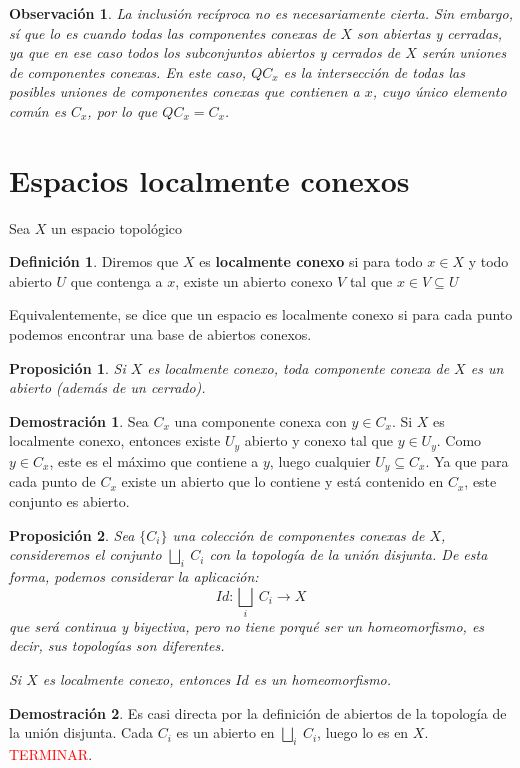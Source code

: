 \documentclass[12pt,twoside]{report}
\theoremstyle{azul}
\theoremstyle{azul2}
\newtheorem*{obsx}{Observación}
\theoremstyle{plain}
\newtheorem*{prop}{Proposición}
\theoremstyle{definition}
\newtheorem*{defi}{Definición}
\newtheorem*{dem}{Demostración}
\theoremstyle{remark}
\begin{document}
\begin{obsx}
La inclusión recíproca no es necesariamente cierta. Sin embargo, sí que lo es cuando todas las componentes conexas de $X$ son abiertas y cerradas, ya que en ese caso todos los subconjuntos abiertos y cerrados de $X$ serán uniones de componentes conexas. En este caso, $QC_x$ es la intersección de todas las posibles uniones de componentes conexas que contienen a $x$, cuyo único elemento común es $C_x$, por lo que $QC_x = C_x$.
\end{obsx}

\section{Espacios localmente conexos}
Sea $X$ un espacio topológico
\begin{defi}
Diremos que $X$ es \textbf{localmente conexo} si para todo $x \in X$ y todo abierto $U$ que contenga a $x$, existe un abierto conexo $V$ tal que $x \in V \subseteq U$

Equivalentemente, se dice que un espacio es localmente conexo si para cada punto podemos encontrar una base de abiertos conexos.
\end{defi}
\begin{prop}
Si $X$ es localmente conexo, toda componente conexa de $X$ es un abierto (además de un cerrado).
\end{prop}
\begin{dem}
Sea $C_x$ una componente conexa con $y \in C_x$. Si $X$ es localmente conexo, entonces existe $U_y$ abierto y conexo tal que $y \in U_y$. Como $y \in C_x$, este es el máximo que contiene a $y$, luego cualquier $U_y \subseteq C_x$. Ya que para cada punto de $C_x$ existe un abierto que lo contiene y está contenido en $C_x$, este conjunto es abierto.
\end{dem}
\begin{prop}
Sea $\{C_i\}$ una colección de componentes conexas de $X$, consideremos el conjunto $\displaystyle \underset{i}{\bigsqcup} \: C_i$ con la topología de la unión disjunta. De esta forma, podemos considerar la aplicación:
$$Id: \underset{i}{\bigsqcup} \: C_i \longrightarrow X$$
que será continua y biyectiva, pero no tiene porqué ser un homeomorfismo, es decir, sus topologías son diferentes. 

Si $X$ es localmente conexo, entonces $Id$ es un homeomorfismo. 
\end{prop}
\begin{dem}
Es casi directa por la definición de abiertos de la topología de la unión disjunta. Cada $C_i$ es un abierto en $\underset{i}{\bigsqcup} \: C_i$, luego lo es en $X$. \textcolor{red}{TERMINAR}.
\end{dem}
\end{document}
